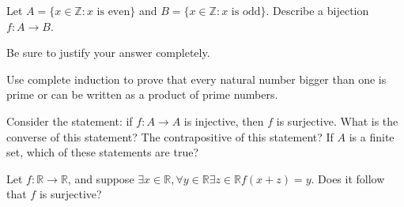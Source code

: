 \documentclass[12pt]{midterm}
\begin{document}
\begin{exam}
\begin{solution}\begin{solutiontext}
\end{solutiontext}\end{solution}


\begin{problem}[350]
Let $A = \{ x \in \mathbb{Z} : \mbox{$x$ is even} \}$ and $B = \{ x
\in \mathbb{Z} : \mbox{$x$ is odd} \}$.  Describe a bijection $f : A
\to B$.

Be sure to justify your answer completely.
\end{problem}

\begin{solution}\begin{solutiontext}
\end{solutiontext}\end{solution}

\begin{problem}[350]
  Use complete induction to prove that every natural number bigger
  than one is prime or can be written as a product of prime numbers.
\end{problem}

\begin{solution}\begin{solutiontext}
\end{solutiontext}\end{solution}

\begin{problem}[350]
Consider the statement: if $f : A \to A$ is injective, then $f$ is
surjective.  What is the converse of this statement?  The
contrapositive of this statement?  If $A$ is a finite set, which of
these statements are true?
\end{problem}

\begin{solution}\begin{solutiontext}
\end{solutiontext}\end{solution}

\begin{problem}[350]
  Let $f : \mathbb{R} \to \mathbb{R}$, and suppose $\exists x \in
  \mathbb{R}, \forall y \in \mathbb{R} \exists z \in \mathbb{R} f(x +
  z) = y$.  Does it follow that $f$ is surjective?
\end{problem}


\end{exam}
\end{document}
